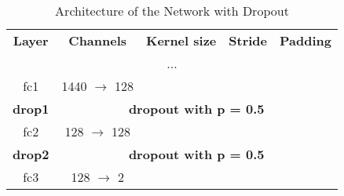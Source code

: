 \begin{table}[htbp]
	\caption{Architecture of the Network with Dropout}
	\begin{center}
		\begin{tabular}{|c|c|c|c|c|}
			\hline
			\textbf{Layer}&\textbf{Channels} &\textbf{Kernel size} &\textbf{Stride} &\textbf{Padding}\\
			\cline{1-5}
			\multicolumn{5}{|c|}{...} \\ \hline
			fc1 &  1440 $\rightarrow$ 128 &  &  &  \\ \hline
			\bfseries drop1 & \multicolumn{4}{c|}{\bfseries dropout with p = 0.5} \\ \hline
			fc2 &  128 $\rightarrow$ 128 &  &  &  \\ \hline
			\bfseries drop2 & \multicolumn{4}{c|}{\bfseries dropout with p = 0.5} \\ \hline
			fc3 &  128 $\rightarrow$   2 &  &  &  \\ \hline
		\end{tabular}
		\label{tab: dropout}
	\end{center}
\end{table}

